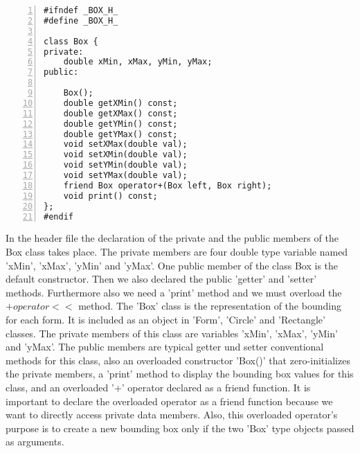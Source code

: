 \documentclass{article}
\begin{document}
\begin{lstlisting}[basicstyle=\footnotesize\ttfamily, numbers=left, stepnumber=1, numberstyle = \normalsize]
#ifndef _BOX_H_
#define _BOX_H_

class Box {
private:
	double xMin, xMax, yMin, yMax;
public:
	
	Box();
	double getXMin() const;
	double getXMax() const;
	double getYMin() const;
	double getYMax() const;
	void setXMax(double val);
	void setXMin(double val);
	void setYMin(double val);
	void setYMax(double val);
	friend Box operator+(Box left, Box right);
	void print() const;
};
#endif
\end{lstlisting}
\normalsize{In the header file the declaration of the private and the public members of the Box class takes place.\newline
\newline
The private members are four double type variable named 'xMin', 'xMax', 'yMin' and 'yMax'.\newline
One public member of the class Box is the default constructor.\newline 
Then we also declared the public 'getter' and 'setter' methods. Furthermore also we need a 'print' method and we must overload the $+operator<<$ method.\newline
\newline
The 'Box' class is the representation of the bounding for each form. It is included as an object in 'Form', 'Circle' and 'Rectangle' classes.
The private members of this class are variables 'xMin', 'xMax', 'yMin' and 'yMax'. 
The public members are typical getter und setter conventional methods for this class, also an overloaded constructor 'Box()' that zero-initializes the private members, a 'print' method to display the bounding box values for this class, and an overloaded '+' operator declared as a friend function. It is important to declare the overloaded operator as a friend function because we want to directly access private data members. 
Also, this overloaded operator's purpose is to create a new bounding box only if the two 'Box' type objects passed as arguments. 
	
}\newpage
\end{document}
